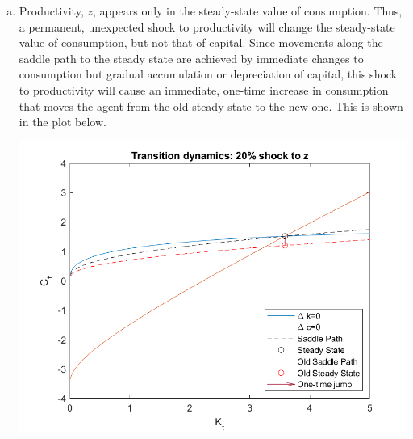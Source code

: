 \documentclass{article}
\begin{document}
\begin{enumerate}[(a)]
\pagebreak
	\item Productivity, $z$, appears only in the steady-state value of consumption. Thus, a permanent, unexpected shock to productivity will change the steady-state value of consumption, but not that of capital. Since movements along the saddle path to the steady state are achieved by immediate changes to consumption but gradual accumulation or depreciation of capital, this shock to productivity will cause an immediate, one-time increase in consumption that moves the agent from the old steady-state to the new one. This is shown in the plot below.
		\begin{center}
			\includegraphics[scale = .8]{figure3.png}
		\end{center}
	
\end{enumerate}

\end{document}
